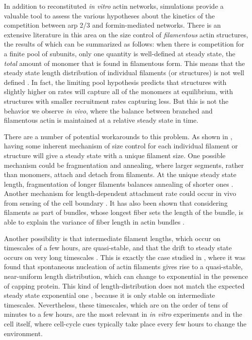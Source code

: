\documentclass[11pt]{article}
\begin{document}
In addition to reconstituted \emph{in vitro} actin networks, simulations provide a valuable tool to assess the various hypotheses about the kinetics of the competition between arp 2/3 and formin-mediated networks. There is an extensive literature in this area on the size control of \emph{filamentous} actin structures, the results of which can be summarized as follows: when there is competition for a finite pool of subunits, only one quantity is well-defined at steady state, the \emph{total} amount of monomer that is found in filamentous form. This means that the steady state length distribution of individual filaments (or structures) is not well defined \cite{mohapatra2017limiting,harbage2016exact}. In fact, the limiting pool hypothesis predicts that structures with slightly higher on rates will capture all of the monomers at equilibrium, with structures with smaller recruitment rates capturing less. But this is not the behavior we observe \emph{in vivo}, where the balance between branched and filamentous actin is maintained at a relative steady state in time. 

There are a number of potential workarounds to this problem. As shown in \cite{banerjee2022size}, having some inherent mechanism of size control for each individual filament or structure will give a steady state with a unique filament size. One possible mechanism could be fragmentation and annealing, where larger segments, rather than monomers, attach and detach from filaments. At the unique steady state length, fragmentation of longer filaments balances annealing of shorter ones \cite{fass2008stochastic}. Another mechanism for length-dependent attachment rate could occur in vivo from sensing of the cell boundary \cite{mcinally2021scaling}. It has also been shown that considering filaments as part of bundles, whose longest fiber sets the length of the bundle, is able to explain the variance of fiber length in actin bundles  \cite{rosario2023universal}.

Another possibility is that intermediate filament lengths, which occur on timescales of a few hours, are quasi-stable, and that the drift to steady state occurs on very long timescales \cite{hu2007theoretical,suarez2017enough}. This is exactly the case studied in \cite{banerjee2022emergence}, where it was found that spontaneous nucleation of actin filaments gives rise to a quasi-stable, near-uniform length distribution, which can change to exponential in the presence of capping protein. This kind of length-distribution does not match the expected steady state exponential one \cite{edelstein1998models}, because it is only stable on intermediate timescales. Nevertheless, these timescales, which are on the order of tens of minutes to a few hours, are the most relevant in \emph{in vitro} experiments and in the cell itself, where cell-cycle cues typically take place every few hours to change the environment. 
\end{document}
